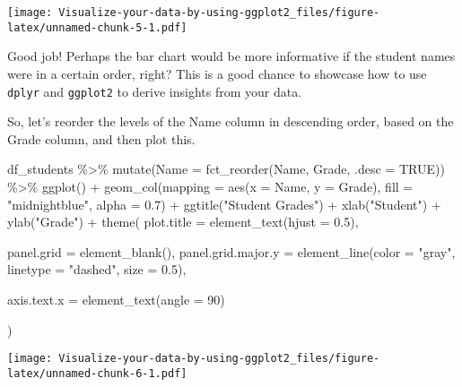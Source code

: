 \documentclass[
]{article}
\newenvironment{Shaded}{\begin{snugshade}}{\end{snugshade}}
\newcommand{\AttributeTok}[1]{\textcolor[rgb]{0.77,0.63,0.00}{#1}}
\newcommand{\ConstantTok}[1]{\textcolor[rgb]{0.00,0.00,0.00}{#1}}
\newcommand{\DecValTok}[1]{\textcolor[rgb]{0.00,0.00,0.81}{#1}}
\newcommand{\FloatTok}[1]{\textcolor[rgb]{0.00,0.00,0.81}{#1}}
\newcommand{\FunctionTok}[1]{\textcolor[rgb]{0.00,0.00,0.00}{#1}}
\newcommand{\NormalTok}[1]{#1}
\newcommand{\SpecialCharTok}[1]{\textcolor[rgb]{0.00,0.00,0.00}{#1}}
\newcommand{\StringTok}[1]{\textcolor[rgb]{0.31,0.60,0.02}{#1}}
\begin{document}
\texttt{[image: Visualize-your-data-by-using-ggplot2\_files/figure-latex/unnamed-chunk-5-1.pdf]}

Good job! Perhaps the bar chart would be more informative if the student
names were in a certain order, right? This is a good chance to showcase
how to use \texttt{dplyr} and \texttt{ggplot2} to derive insights from
your data.

So, let's reorder the levels of the Name column in descending order,
based on the Grade column, and then plot this.

\begin{Shaded}
\begin{Highlighting}[]
\NormalTok{df\_students }\SpecialCharTok{\%\textgreater{}\%} 
  \FunctionTok{mutate}\NormalTok{(}\AttributeTok{Name =} \FunctionTok{fct\_reorder}\NormalTok{(Name, Grade, }\AttributeTok{.desc =} \ConstantTok{TRUE}\NormalTok{)) }\SpecialCharTok{\%\textgreater{}\%} 
  \FunctionTok{ggplot}\NormalTok{() }\SpecialCharTok{+}
  \FunctionTok{geom\_col}\NormalTok{(}\AttributeTok{mapping =} \FunctionTok{aes}\NormalTok{(}\AttributeTok{x =}\NormalTok{ Name, }\AttributeTok{y =}\NormalTok{ Grade),}
           \AttributeTok{fill =} \StringTok{"midnightblue"}\NormalTok{, }\AttributeTok{alpha =} \FloatTok{0.7}\NormalTok{) }\SpecialCharTok{+}
  \FunctionTok{ggtitle}\NormalTok{(}\StringTok{"Student Grades"}\NormalTok{) }\SpecialCharTok{+}
  \FunctionTok{xlab}\NormalTok{(}\StringTok{"Student"}\NormalTok{) }\SpecialCharTok{+}
  \FunctionTok{ylab}\NormalTok{(}\StringTok{"Grade"}\NormalTok{) }\SpecialCharTok{+}
  \FunctionTok{theme}\NormalTok{(}
    \AttributeTok{plot.title =} \FunctionTok{element\_text}\NormalTok{(}\AttributeTok{hjust =} \FloatTok{0.5}\NormalTok{),}
    
    \AttributeTok{panel.grid =} \FunctionTok{element\_blank}\NormalTok{(),}
    \AttributeTok{panel.grid.major.y =} \FunctionTok{element\_line}\NormalTok{(}\AttributeTok{color =} \StringTok{"gray"}\NormalTok{, }\AttributeTok{linetype =} \StringTok{"dashed"}\NormalTok{, }\AttributeTok{size =} \FloatTok{0.5}\NormalTok{),}
    
    \AttributeTok{axis.text.x =} \FunctionTok{element\_text}\NormalTok{(}\AttributeTok{angle =} \DecValTok{90}\NormalTok{)}
    
\NormalTok{  )}
\end{Highlighting}
\end{Shaded}

\texttt{[image: Visualize-your-data-by-using-ggplot2\_files/figure-latex/unnamed-chunk-6-1.pdf]}
\end{document}
